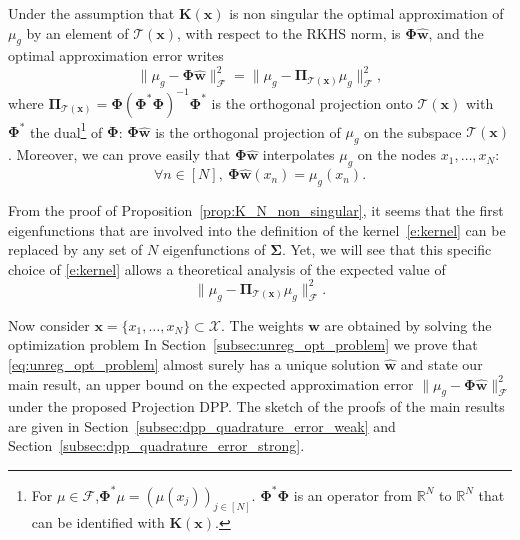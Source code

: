 \documentclass[twoside,11pt]{book}
\begin{document}
 Under the assumption that $\bm{K}(\bm{x})$ is non singular the optimal approximation of $\mu_{g}$ by an element of $\mathcal{T}(\bm{x})$, with respect to the RKHS norm, is $\bm{\Phi}\hat{\bm{w}}$, and the optimal approximation error writes
\begin{equation}
\|\mu_{g} - \bm{\Phi}\hat{\bm{w}}\|^{2}_{\mathcal{F}} =\|\mu_{g} - \bm{\Pi}_{\mathcal{T}(\bm{x})}\mu_{g}\|^{2}_{\mathcal{F}},\label{e:finalTool}
\end{equation}
where $\bm{\Pi}_{\mathcal{T}(\bm{x})} = \bm{\Phi}(\bm{\Phi}^{*}\bm{\Phi})^{-1}\bm{\Phi}^{*}$ is the orthogonal projection onto $\mathcal{T}(\bm{x})$ with $\bm{\Phi}^{*}$ the dual\footnote{For $\mu \in \mathcal{F}$,$\bm{\Phi}^{*}\mu = (\mu(x_{j}))_{j \in [N]}$. $\bm{\Phi}^{*}\bm{\Phi}$ is an operator from $\mathbb{R}^{N}$ to $\mathbb{R}^{N}$ that can be identified with $\bm{K}(\bm{x})$.} of $\bm{\Phi}$: $\bm{\Phi}\hat{\bm{w}}$ is the orthogonal projection of $\mu_{g}$ on the subspace $\mathcal{T}(\bm{x})$. Moreover, we can prove easily that $\bm{\Phi}\hat{\bm{w}}$ interpolates $\mu_{g}$ on the nodes $x_{1}, \dots, x_{N}$:
\begin{equation}
\forall n \in [N], \:\bm{\Phi}\hat{\bm{w}}(x_{n}) = \mu_{g}(x_{n}).
\end{equation}

From the proof of Proposition~\ref{prop:K_N_non_singular}, it seems that the first eigenfunctions that are involved into the definition of the kernel~\eqref{e:kernel}
 can be replaced by any set of $N$ eigenfunctions of $\bm{\Sigma}$. Yet, we will see that this specific choice of \eqref{e:kernel} allows a theoretical analysis of the expected value of 
 \begin{equation}
 \|\mu_{g} - \bm{\Pi}_{\mathcal{T}(\bm{x})} \mu_{g}\|_{\mathcal{F}}^{2}.
 \end{equation}


Now consider $\bm{x} = \{x_{1}, \dots, x_{N} \} \subset \mathcal{X}$. The weights $\bm{w}$ are obtained by solving the optimization problem
 In Section~\ref{subsec:unreg_opt_problem} we prove that \eqref{eq:unreg_opt_problem} almost surely has a unique solution $\hat{\bm{w}}$ and state our main result, an upper bound on the expected approximation error $\|\mu_{g} - \bm{\Phi}\hat{\bm{w}}\|^{2}_{\mathcal{F}}$ under the proposed Projection DPP. The sketch of the proofs of the main results are given in Section~\ref{subsec:dpp_quadrature_error_weak} and  Section~\ref{subsec:dpp_quadrature_error_strong}.
\end{document}
